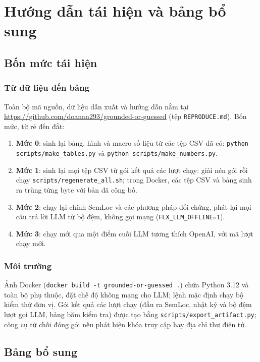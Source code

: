 \chapter{Hướng dẫn tái hiện và bảng bổ sung}
\label{chap:phu-luc}

\section{Bốn mức tái hiện}
\label{sec:tai-hien}

\subsection{Từ dữ liệu đến bảng}

Toàn bộ mã nguồn, dữ liệu dẫn xuất và hướng dẫn nằm tại \url{https://github.com/doanan293/grounded-or-guessed}
(tệp \texttt{REPRODUCE.md}). Bốn mức, từ rẻ đến đắt:
\begin{enumerate}
\item \textbf{Mức 0}: sinh lại bảng, hình và macro số liệu từ các tệp CSV đã có: \texttt{python scripts/make\_tables.py}
và \texttt{python scripts/make\_numbers.py}.
\item \textbf{Mức 1}: sinh lại mọi tệp CSV từ gói kết quả các lượt chạy: giải nén gói rồi chạy
\texttt{scripts/regenerate\_all.sh}; trong Docker, các tệp CSV và bảng sinh ra trùng từng byte với bản đã công bố.
\item \textbf{Mức 2}: chạy lại chính SemLoc và các phương pháp đối chứng, phát lại mọi câu trả lời LLM từ bộ đệm, không gọi mạng
(\texttt{FLX\_LLM\_OFFLINE=1}).
\item \textbf{Mức 3}: chạy mới qua một điểm cuối LLM tương thích OpenAI, với mã lượt chạy mới.
\end{enumerate}

\subsection{Môi trường}

Ảnh Docker (\texttt{docker build -t grounded-or-guessed .}) chứa Python 3.12 và toàn bộ phụ thuộc, đặt chế độ không mạng
cho LLM; lệnh mặc định chạy bộ kiểm thử đơn vị. Gói kết quả các lượt chạy (đầu ra SemLoc, nhật ký và bộ đệm lượt gọi LLM,
bảng băm kiểm tra) được tạo bằng \texttt{scripts/export\_artifact.py}; công cụ từ chối đóng gói nếu phát hiện khóa truy
cập hay địa chỉ thư điện tử.

\section{Bảng bổ sung}
\label{sec:bang-bo-sung}


